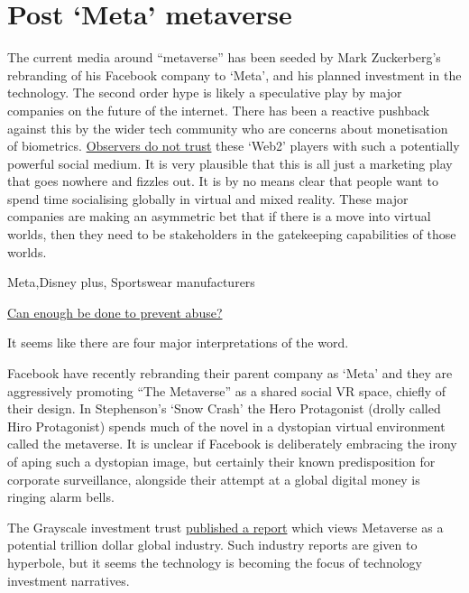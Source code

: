 \section{Post `Meta' metaverse}
The current media around ``metaverse'' has been seeded by Mark Zuckerberg's rebranding of his Facebook company to `Meta', and his planned investment in the technology. The second order hype is likely a speculative play by major companies on the future of the internet. There has been a reactive pushback against this by the wider tech community who are concerns about monetisation of biometrics. \href{https://www.coindesk.com/layer2/2022/01/19/meta-leans-in-to-tracking-your-emotions-in-the-metaverse/}{Observers do not trust} these `Web2' players with such a potentially powerful social medium. It is very plausible that this is all just a marketing play that goes nowhere and fizzles out. It is by no means clear that people want to spend time socialising globally in virtual and mixed reality. These major companies are  making an asymmetric bet that if there is a move into virtual worlds, then they need to be stakeholders in the gatekeeping capabilities of those worlds.\par 
Meta,Disney plus, Sportswear manufacturers\par

\href{https://medium.com/kabuni/fiction-vs-non-fiction-98aa0098f3b0}{Can enough be done to prevent abuse?}

It seems like there are four major interpretations of the word.\par

Facebook have recently rebranding their parent company as `Meta' and they are aggressively promoting ``The Metaverse'' as a shared social VR space, chiefly of their design. In Stephenson's `Snow Crash' the Hero Protagonist (drolly called Hiro Protagonist) spends much of the novel in a dystopian virtual environment called the metaverse. It is unclear if Facebook is deliberately embracing the irony of aping such a dystopian image, but certainly their known predisposition for corporate surveillance, alongside their attempt at a global digital money is ringing alarm bells.\par
The Grayscale investment trust \href{https://grayscale.com/wp-content/uploads/2021/11/Grayscale_Metaverse_Report_Nov2021.pdf}{published a report} which views Metaverse as a potential trillion dollar global industry. Such industry reports are given to hyperbole, but it seems the technology is becoming the focus of technology investment narratives.
